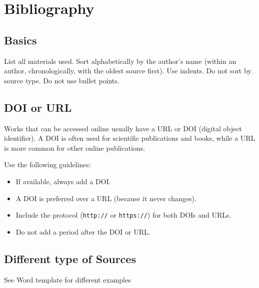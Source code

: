 

\section{Bibliography}


\subsection{Basics}
List all materials used. Sort alphabetically by the author's name (within an author, chronologically, with the oldest source first). Use indents. Do not sort by source type. Do not use bullet points.


\subsection{DOI or URL}
Works that can be accessed online usually have a URL or DOI (digital object identifier). A DOI is often used for scientific publications and books, while a URL is more common for other online publications.

Use the following guidelines:
\begin{itemize}
    \item If available, always add a DOI.
    \item A DOI is preferred over a URL (because it never changes).
    \item Include the protocol (\texttt{http://} or \texttt{https://}) for both DOIs and URLs.
    \item Do not add a period after the DOI or URL.
\end{itemize}
\subsection{Different type of Sources}
\begin{Large}
    See Word template for different examples
\end{Large}